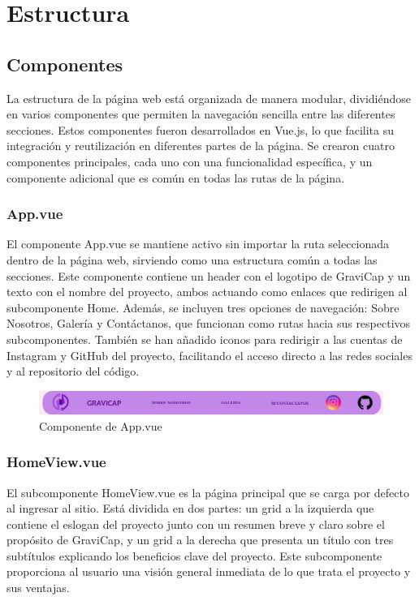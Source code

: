     \section{Estructura}
            \subsection{Componentes}
                La estructura de la página web está organizada de manera modular, dividiéndose en varios componentes que permiten la navegación sencilla entre las diferentes secciones. Estos componentes fueron desarrollados en Vue.js, lo que facilita su integración y reutilización en diferentes partes de la página. Se crearon cuatro componentes principales, cada uno con una funcionalidad específica, y un componente adicional que es común en todas las rutas de la página.\par
                
                \subsubsection{App.vue}
                    El componente App.vue se mantiene activo sin importar la ruta seleccionada dentro de la página web, sirviendo como una estructura común a todas las secciones. Este componente contiene un header con el logotipo de \textcolor{dark_violet}{GraviCap} y un texto con el nombre del proyecto, ambos actuando como enlaces que redirigen al subcomponente Home. Además, se incluyen tres opciones de navegación: Sobre Nosotros, Galería y Contáctanos, que funcionan como rutas hacia sus respectivos subcomponentes. También se han añadido iconos para redirigir a las cuentas de Instagram y GitHub del proyecto, facilitando el acceso directo a las redes sociales y al repositorio del código.\par
                    
                    \begin{figure}[!ht]
                        \centering
                        \includegraphics[width=\linewidth]{Imagenes/Página Web/App.jpg}
                        \caption{Componente de App.vue}
                        \label{fig:pw1}
                    \end{figure}
                    
                \subsubsection{HomeView.vue}
                    El subcomponente HomeView.vue es la página principal que se carga por defecto al ingresar al sitio. Está dividida en dos partes: un grid a la izquierda que contiene el eslogan del proyecto junto con un resumen breve y claro sobre el propósito de \textcolor{dark_violet}{GraviCap}, y un grid a la derecha que presenta un título con tres subtítulos explicando los beneficios clave del proyecto. Este subcomponente proporciona al usuario una visión general inmediata de lo que trata el proyecto y sus ventajas.\par
                    
